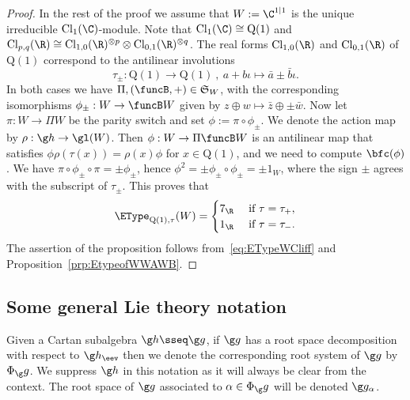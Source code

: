 \documentclass[12pt]{amsart}
\begin{document}
\begin{proof}
In the rest of the proof we assume that $W:=\C^{1|1}$ is the unique irreducible $\mathrm{Cl}_1(\C)$-module. Note that
$\mathrm{Cl}_1(\C)\cong \mathrm{Q}(1)$ and  
$
\mathrm{Cl}_{p,q}(\R)\cong \mathrm{Cl}_{1,0}(\R)^{\otimes p}\otimes \mathrm{Cl}_{0,1}(\R)^{\otimes q}
$. The real forms $\mathrm{Cl}_{1,0}(\R)$ and $\mathrm{Cl}_{0,1}(\R)$ of $\mathrm{Q}(1)$ correspond to the antilinear involutions
\[
\tau_\pm:\mathrm{Q}(1)\to\mathrm{Q}(1)
\ ,\
a+b\iota\mapsto \bar a\pm \bar b\iota.
\]
In both cases we have $\Pi,(\funcB,+)\in\mathfrak S_{W}$, with the corresponding isomorphisms $\phi_\pm : W\to \funcB W$ given by  $z\oplus w\mapsto \bar z\oplus\pm  \bar w$. Now let $\pi:W\to \Pi W$ be the parity switch and set $\phi:=\pi\circ \phi_\pm$. We denote the action map by $\rho:\g h\to \gl(W)$. Then $\phi:W\to \Pi \funcB W$ is an antilinear map that satisfies $\phi\rho(\tau(x))=\rho(x)\phi$ for $x\in\mathrm{Q}(1)$, and we need to compute $\bfc(\phi)$. We have $\pi\circ \phi_\pm \circ \pi=\pm \phi_\pm$, hence $\phi^2=\pm \phi_\pm \circ \phi_\pm=\pm 1_W$, where the sign $\pm $ agrees with  the subscript of $\tau_\pm$.  This proves that   
\begin{equation}
\label{eq:ETypeWCliff}
\EType_{\mathrm{Q}(1),\tau}(W)=
\begin{cases}
7_\R& \text{ if }\tau=\tau_+,\\
1_\R&\text{ if }\tau=\tau_-.
\end{cases}
\end{equation}
The assertion of the proposition follows from~\eqref{eq:ETypeWCliff} and Proposition~\ref{prp:EtypeofWWAWB}. 
\end{proof}


\subsection{Some general Lie theory notation}
\label{subsec:generalLie}
 Given a Cartan subalgebra $\g h\sseq \g g$, if $\g g$ has a root space decomposition
with respect to $\g h_\eev$ then  we denote the corresponding root system of $\g g$ by $\Phi_\g g$. 
We suppress $\g h $ in this notation as it will always be clear from the context. The root space of $\g g$ associated to $\alpha\in\Phi_\g g$ will be denoted $\g g_\alpha$.
\end{document}

